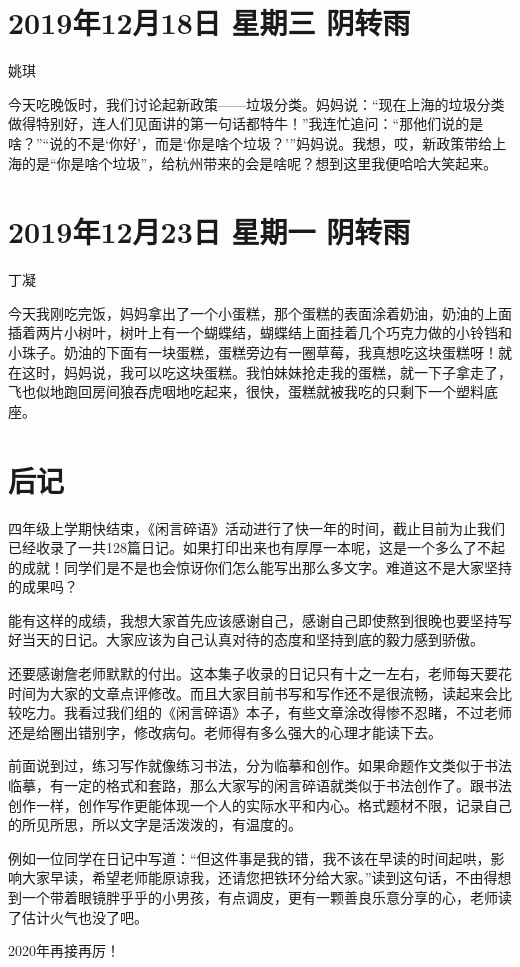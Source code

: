 \section{2019年12月18日 星期三 阴转雨}

姚琪

今天吃晚饭时，我们讨论起新政策------垃圾分类。妈妈说：``现在上海的垃圾分类做得特别好，连人们见面讲的第一句话都特牛！''我连忙追问：``那他们说的是啥？''``说的不是`你好'，而是`你是啥个垃圾？'''妈妈说。我想，哎，新政策带给上海的是``你是啥个垃圾''，给杭州带来的会是啥呢？想到这里我便哈哈大笑起来。

\section{2019年12月23日 星期一 阴转雨}

丁凝

今天我刚吃完饭，妈妈拿出了一个小蛋糕，那个蛋糕的表面涂着奶油，奶油的上面插着两片小树叶，树叶上有一个蝴蝶结，蝴蝶结上面挂着几个巧克力做的小铃铛和小珠子。奶油的下面有一块蛋糕，蛋糕旁边有一圈草莓，我真想吃这块蛋糕呀！就在这时，妈妈说，我可以吃这块蛋糕。我怕妹妹抢走我的蛋糕，就一下子拿走了，飞也似地跑回房间狼吞虎咽地吃起来，很快，蛋糕就被我吃的只剩下一个塑料底座。

\section{后记}

四年级上学期快结束，《闲言碎语》活动进行了快一年的时间，截止目前为止我们已经收录了一共128篇日记。如果打印出来也有厚厚一本呢，这是一个多么了不起的成就！同学们是不是也会惊讶你们怎么能写出那么多文字。难道这不是大家坚持的成果吗？

能有这样的成绩，我想大家首先应该感谢自己，感谢自己即使熬到很晚也要坚持写好当天的日记。大家应该为自己认真对待的态度和坚持到底的毅力感到骄傲。

还要感谢詹老师默默的付出。这本集子收录的日记只有十之一左右，老师每天要花时间为大家的文章点评修改。而且大家目前书写和写作还不是很流畅，读起来会比较吃力。我看过我们组的《闲言碎语》本子，有些文章涂改得惨不忍睹，不过老师还是给圈出错别字，修改病句。老师得有多么强大的心理才能读下去。

前面说到过，练习写作就像练习书法，分为临摹和创作。如果命题作文类似于书法临摹，有一定的格式和套路，那么大家写的闲言碎语就类似于书法创作了。跟书法创作一样，创作写作更能体现一个人的实际水平和内心。格式题材不限，记录自己的所见所思，所以文字是活泼泼的，有温度的。

例如一位同学在日记中写道：``但这件事是我的错，我不该在早读的时间起哄，影响大家早读，希望老师能原谅我，还请您把铁环分给大家。''读到这句话，不由得想到一个带着眼镜胖乎乎的小男孩，有点调皮，更有一颗善良乐意分享的心，老师读了估计火气也没了吧。

2020年再接再厉！

